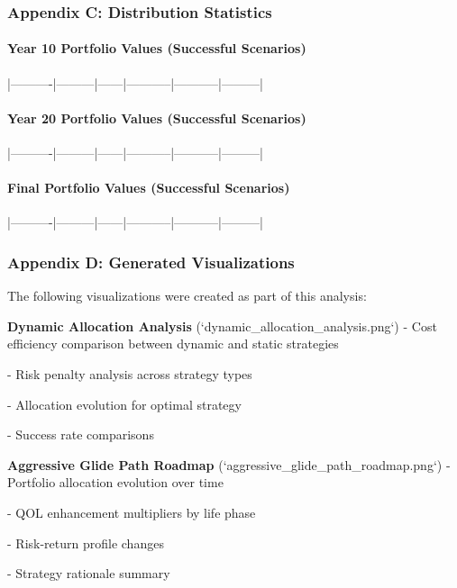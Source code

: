 \documentclass[11pt,letterpaper]{article}
\begin{document}
{{{{{{{{{{{\subsubsection{Appendix C: Distribution Statistics}


\paragraph{Year 10 Portfolio Values (Successful Scenarios)}

|----------|---------|------|-----------|-----------|---------|


\paragraph{Year 20 Portfolio Values (Successful Scenarios)}

|----------|---------|------|-----------|-----------|---------|


\paragraph{Final Portfolio Values (Successful Scenarios)}

|----------|---------|------|-----------|-----------|---------|


\subsubsection{Appendix D: Generated Visualizations}


The following visualizations were created as part of this analysis:


\item \textbf{Dynamic Allocation Analysis} (`dynamic_allocation_analysis.png`)
   - Cost efficiency comparison between dynamic and static strategies

   - Risk penalty analysis across strategy types

   - Allocation evolution for optimal strategy

   - Success rate comparisons


\item \textbf{Aggressive Glide Path Roadmap} (`aggressive_glide_path_roadmap.png`)
   - Portfolio allocation evolution over time

   - QOL enhancement multipliers by life phase

   - Risk-return profile changes

   - Strategy rationale summary


}}}}}}}}}}}
\end{document}
